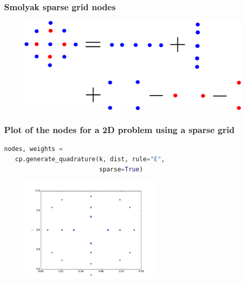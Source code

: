 \documentclass{beamer}
\begin{document}
\begin{frame}
 \frametitle{Smolyak sparse grid nodes}


 \begin{figure}
  \includegraphics[width=\textwidth]{smolyak.png}
 \end{figure}

\end{frame}


\begin{frame}[fragile]
 \frametitle{Plot of the nodes for a 2D problem using a sparse grid}
 \begin{lstlisting}[language=python]
  nodes, weights = 
   cp.generate_quadrature(k, dist, rule="E",
                          sparse=True)
 \end{lstlisting}

 \pause
 \begin{figure}
  \includegraphics[width=0.6\textwidth]{nodes_sparse.png}
 \end{figure}
\end{frame}
 
\end{document}
